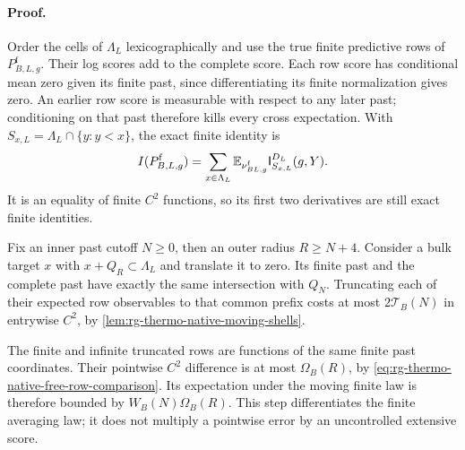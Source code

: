 \paragraph{Proof.}
Order the cells of \(\Lambda_L\) lexicographically and use the true
finite predictive rows of \(P^{\mathrm f}_{B,L,g}\). Their log scores add
to the complete score. Each row score has conditional mean zero given
its finite past, since differentiating its finite normalization gives
zero. An earlier row score is measurable with respect to any later past;
conditioning on that past therefore kills every cross expectation. With
\(S_{x,L}=\Lambda_L\cap\{y:y<x\}\), the exact finite identity is
\begin{equation}
 I(P^{\mathrm f}_{B,L,g})=
    \sum_{x\in\Lambda_L}\mathbb E_{\nu^{\mathrm f}_{BL,g}}
                              \mathsf I^{D_L}_{S_{x,L}}(g,Y).
 \label{eq:rg-thermo-native-finite-score-rows}
\end{equation}
It is an equality of finite \(C^2\) functions, so its first two derivatives
are still exact finite identities.

Fix an inner past cutoff \(N\ge0\), then an outer radius
\(R\ge N+4\). Consider a bulk target \(x\) with
\(x+Q_R\subset\Lambda_L\) and translate it to zero. Its finite past
and the complete past have exactly the same intersection with \(Q_N\).
Truncating each of their expected row observables to that common prefix
costs at most \(2\mathcal T_B(N)\) in entrywise \(C^2\), by
\cref{lem:rg-thermo-native-moving-shells}.

The finite and infinite truncated rows are functions of the same finite
past coordinates. Their pointwise \(C^2\) difference is at most
\(\Omega_B(R)\), by
\cref{eq:rg-thermo-native-free-row-comparison}. Its expectation under the
moving finite law is therefore bounded by \(W_B(N)\Omega_B(R)\).
This step differentiates the finite averaging law; it does not multiply a
pointwise error by an uncontrolled extensive score.

